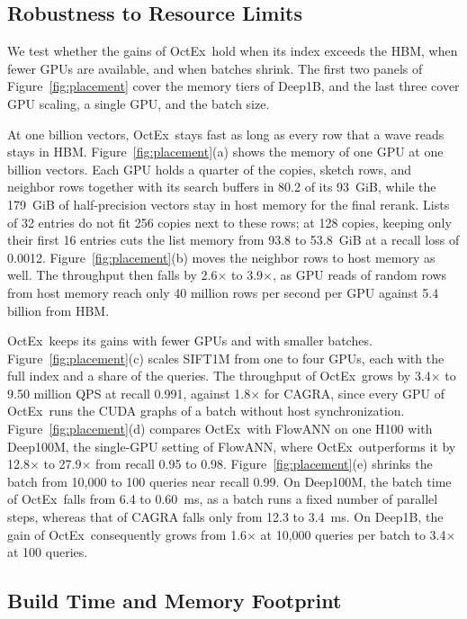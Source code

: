 \documentclass[letterpaper,twocolumn,10pt]{article}
\newcommand{\sysname}{OctEx}
\begin{document}
\subsection{Robustness to Resource Limits}
\label{sec:eval-deploy}

We test whether the gains of \sysname\ hold when its index exceeds the HBM, when fewer GPUs are available, and when batches shrink. The first two panels of Figure~\ref{fig:placement} cover the memory tiers of Deep1B, and the last three cover GPU scaling, a single GPU, and the batch size.

At one billion vectors, \sysname\ stays fast as long as every row that a wave reads stays in HBM. Figure~\ref{fig:placement}(a) shows the memory of one GPU at one billion vectors. Each GPU holds a quarter of the copies, sketch rows, and neighbor rows together with its search buffers in 80.2 of its 93~GiB, while the 179~GiB of half-precision vectors stay in host memory for the final rerank. Lists of 32 entries do not fit 256 copies next to these rows; at 128 copies, keeping only their first 16 entries cuts the list memory from 93.8 to 53.8~GiB at a recall loss of 0.0012. Figure~\ref{fig:placement}(b) moves the neighbor rows to host memory as well. The throughput then falls by 2.6$\times$ to 3.9$\times$, as GPU reads of random rows from host memory reach only 40 million rows per second per GPU against 5.4 billion from HBM.

\sysname\ keeps its gains with fewer GPUs and with smaller batches. Figure~\ref{fig:placement}(c) scales SIFT1M from one to four GPUs, each with the full index and a share of the queries. The throughput of \sysname\ grows by 3.4$\times$ to 9.50 million QPS at recall 0.991, against 1.8$\times$ for CAGRA, since every GPU of \sysname\ runs the CUDA graphs of a batch without host synchronization. Figure~\ref{fig:placement}(d) compares \sysname\ with FlowANN on one H100 with Deep100M, the single-GPU setting of FlowANN, where \sysname\ outperforms it by 12.8$\times$ to 27.9$\times$ from recall 0.95 to 0.98. Figure~\ref{fig:placement}(e) shrinks the batch from 10,000 to 100 queries near recall 0.99. On Deep100M, the batch time of \sysname\ falls from 6.4 to 0.60~ms, as a batch runs a fixed number of parallel steps, whereas that of CAGRA falls only from 12.3 to 3.4~ms. On Deep1B, the gain of \sysname\ consequently grows from 1.6$\times$ at 10,000 queries per batch to 3.4$\times$ at 100 queries.

\subsection{Build Time and Memory Footprint}
\label{sec:eval-build}
\end{document}
